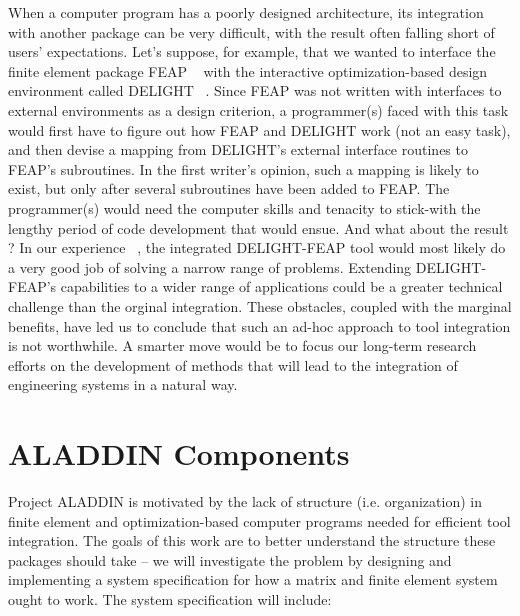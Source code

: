 \vspace{0.15 in}
\noindent\hspace{0.50 in}
When a computer program has a poorly designed architecture,
its integration with another package can be very difficult,
with the result often falling short of users' expectations.
Let's suppose, for example, that we wanted to interface the
finite element package FEAP ~\cite{zienkiewitz89} with the interactive
optimization-based design environment called DELIGHT ~\cite{balling83,nye87,wu86}.
Since FEAP was not written with interfaces to external environments
as a design criterion, a programmer(s)
faced with this task would first have to figure out
how FEAP and DELIGHT work (not an easy task),
and then devise a mapping from DELIGHT's external
interface routines to FEAP's subroutines.
In the first writer's opinion, such a mapping is likely to exist,
but only after several subroutines have been added to FEAP.
The programmer(s) would need the computer skills and tenacity to stick-with the
lengthy period of code development that would ensue.
And what about the result ?
In our experience ~\cite{austin87a,austin87b,balling83},
the integrated DELIGHT-FEAP tool would most likely do a
very good job of solving a narrow range of problems.
Extending DELIGHT-FEAP's capabilities to a wider range of
applications could be a greater technical challenge than the orginal integration.
These obstacles, coupled with the marginal benefits, have led us to conclude that
such an ad-hoc approach to tool integration is not worthwhile.
A smarter move would be to focus our long-term research efforts
on the development of methods that will lead to
the integration of engineering systems in a natural way.

\section{ALADDIN Components}

\vspace{0.15 in}
\noindent\hspace{0.50 in}
Project ALADDIN is motivated by the lack of structure (i.e. organization) in
finite element and optimization-based computer programs needed for efficient tool integration.
The goals of this work are to better understand the structure these
packages should take -- we will investigate the problem by 
designing and implementing a system specification for how a
matrix and finite element system ought to work.
The system specification will include:

